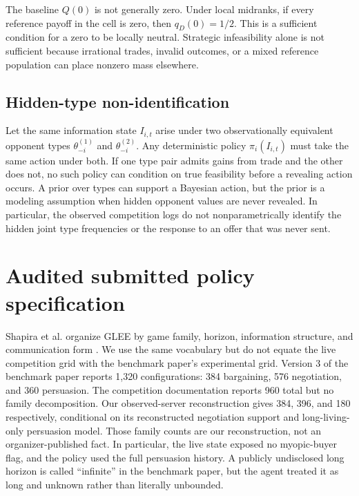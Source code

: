 The baseline $Q(0)$ is not generally zero. Under local midranks, if every
reference payoff in the cell is zero, then $q_D(0)=1/2$. This is a sufficient
condition for a zero to be locally neutral. Strategic infeasibility alone is
not sufficient because irrational trades, invalid outcomes, or a mixed
reference population can place nonzero mass elsewhere.

\subsection{Hidden-type non-identification}

Let the same information state $I_{i,t}$ arise under two observationally
equivalent opponent types $\theta_{-i}^{(1)}$ and $\theta_{-i}^{(2)}$. Any
deterministic policy $\pi_i(I_{i,t})$ must take the same action under both. If
one type pair admits gains from trade and the other does not, no such policy can
condition on true feasibility before a revealing action occurs. A prior
over types can support a Bayesian action, but the prior is a modeling
assumption when hidden opponent values are never revealed. In particular, the
observed competition logs do not nonparametrically identify the hidden joint
type frequencies or the response to an offer that was never sent.

\section{Audited submitted policy specification}
\label{app:policy}

Shapira et al. organize GLEE by game family, horizon, information structure,
and communication form \citep{shapira2024glee}. We use the same vocabulary but
do not equate the live competition grid with the benchmark paper's experimental
grid. Version 3 of the benchmark paper reports 1,320 configurations: 384
bargaining, 576 negotiation, and 360 persuasion. The competition documentation
reports 960 total but no family decomposition. Our observed-server
reconstruction gives 384, 396, and 180 respectively, conditional on its
reconstructed negotiation support and long-living-only persuasion model. Those
family counts are our reconstruction, not an organizer-published fact. In
particular, the live state exposed no myopic-buyer flag, and the policy used the
full persuasion history. A publicly undisclosed long horizon is called
``infinite'' in the benchmark paper, but the agent treated it as long and
unknown rather than literally unbounded.

